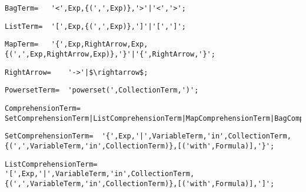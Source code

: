 \documentclass{article}
\begin{document}
    \begin{flushleft}
    \begin{lstlisting}[mathescape=true, breaklines=true]
     BagTerm= 	'<',Exp,{(',',Exp)},'>'|'<','>';
    \end{lstlisting}
    \end{flushleft}
    \begin{flushleft}
    \begin{lstlisting}[mathescape=true, breaklines=true]
     ListTerm= 	'[',Exp,{(',',Exp)},']'|'[',']';
    \end{lstlisting}
    \end{flushleft}
    \begin{flushleft}
    \begin{lstlisting}[mathescape=true, breaklines=true]
     MapTerm= 	'{',Exp,RightArrow,Exp,{(',',Exp,RightArrow,Exp)},'}'|'{',RightArrow,'}';
    \end{lstlisting}
    \end{flushleft}
    \begin{flushleft}
    \begin{lstlisting}[mathescape=true, breaklines=true]
     RightArrow= 	'->'|$\rightarrow$;
    \end{lstlisting}
    \end{flushleft}
    \begin{flushleft}
    \begin{lstlisting}[mathescape=true, breaklines=true]
     PowersetTerm= 	'powerset(',CollectionTerm,')';
    \end{lstlisting}
    \end{flushleft}
    \begin{flushleft}
    \begin{lstlisting}[mathescape=true, breaklines=true]
     ComprehensionTerm= 	SetComprehensionTerm|ListComprehensionTerm|MapComprehensionTerm|BagComprehensionTerm|NumberRangeTerm;
    \end{lstlisting}
    \end{flushleft}
    \begin{flushleft}
    \begin{lstlisting}[mathescape=true, breaklines=true]
     SetComprehensionTerm= 	'{',Exp,'|',VariableTerm,'in',CollectionTerm,{(',',VariableTerm,'in',CollectionTerm)},[('with',Formula)],'}';
    \end{lstlisting}
    \end{flushleft}
    \begin{flushleft}
    \begin{lstlisting}[mathescape=true, breaklines=true]
     ListComprehensionTerm= 	'[',Exp,'|',VariableTerm,'in',CollectionTerm,{(',',VariableTerm,'in',CollectionTerm)},[('with',Formula)],']';
    \end{lstlisting}
    \end{flushleft}
\end{document}
